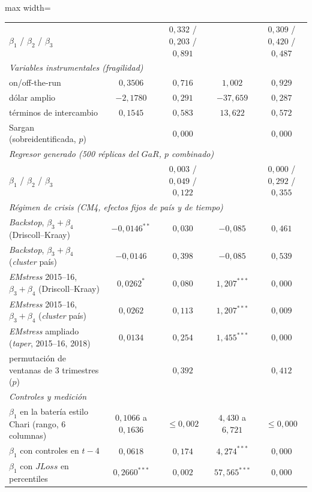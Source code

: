 \begin{table}[htbp]
\begin{adjustbox}{max width=\linewidth}
\begin{tabular}{lcccc}
\quad $\beta_1$ / $\beta_2$ / $\beta_3$ &  & $0{,}332$ / $0{,}203$ / $0{,}891$ &  & $0{,}309$ / $0{,}420$ / $0{,}487$ \\
\multicolumn{5}{l}{\textit{Variables instrumentales (fragilidad)}} \\
\quad on/off-the-run & $0{,}3506$ & $0{,}716$ & $1{,}002$ & $0{,}929$ \\
\quad dólar amplio & $-2{,}1780$ & $0{,}291$ & $-37{,}659$ & $0{,}287$ \\
\quad términos de intercambio & $0{,}1545$ & $0{,}583$ & $13{,}622$ & $0{,}572$ \\
\quad Sargan (sobreidentificada, $p$) &  & $0{,}000$ &  & $0{,}000$ \\
\multicolumn{5}{l}{\textit{Regresor generado (500 réplicas del $GaR$, $p$ combinado)}} \\
\quad $\beta_1$ / $\beta_2$ / $\beta_3$ &  & $0{,}003$ / $0{,}049$ / $0{,}122$ &  & $0{,}000$ / $0{,}292$ / $0{,}355$ \\
\multicolumn{5}{l}{\textit{Régimen de crisis (CM4, efectos fijos de país y de tiempo)}} \\
\quad \textit{Backstop}, $\beta_3+\beta_4$ (Driscoll--Kraay) & $-0{,}0146^{**}$ & $0{,}030$ & $-0{,}085$ & $0{,}461$ \\
\quad \textit{Backstop}, $\beta_3+\beta_4$ (\textit{cluster} país) & $-0{,}0146$ & $0{,}398$ & $-0{,}085$ & $0{,}539$ \\
\quad \textit{EMstress} 2015--16, $\beta_3+\beta_4$ (Driscoll--Kraay) & $0{,}0262^{*}$ & $0{,}080$ & $1{,}207^{***}$ & $0{,}000$ \\
\quad \textit{EMstress} 2015--16, $\beta_3+\beta_4$ (\textit{cluster} país) & $0{,}0262$ & $0{,}113$ & $1{,}207^{***}$ & $0{,}009$ \\
\quad \textit{EMstress} ampliado (\textit{taper}, 2015--16, 2018) & $0{,}0134$ & $0{,}254$ & $1{,}455^{***}$ & $0{,}000$ \\
\quad permutación de ventanas de 3 trimestres ($p$) &  & $0{,}392$ &  & $0{,}412$ \\
\multicolumn{5}{l}{\textit{Controles y medición}} \\
\quad $\beta_1$ en la batería estilo Chari (rango, 6 columnas) & $0{,}1066$ a $0{,}1636$ & $\leq 0{,}002$ & $4{,}430$ a $6{,}721$ & $\leq 0{,}000$ \\
\quad $\beta_1$ con controles en $t-4$ & $0{,}0618$ & $0{,}174$ & $4{,}274^{***}$ & $0{,}000$ \\
\quad $\beta_1$ con $JLoss$ en percentiles & $0{,}2660^{***}$ & $0{,}002$ & $57{,}565^{***}$ & $0{,}000$ \\

\end{tabular}
\end{adjustbox}
\end{table}
